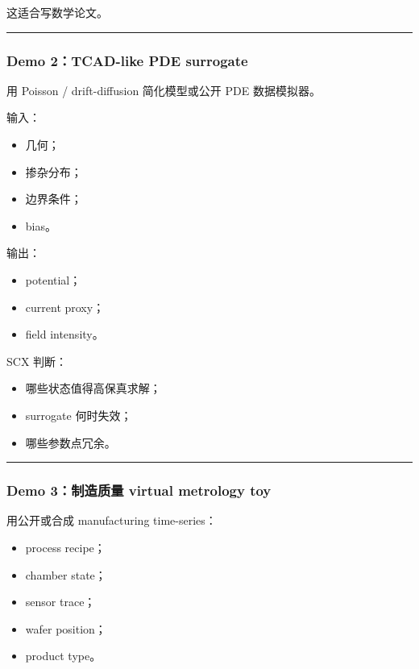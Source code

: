 \documentclass[
  12pt,
]{ctexart}
\providecommand{\tightlist}{%
  \setlength{\itemsep}{0pt}\setlength{\parskip}{0pt}}
\begin{document}
这适合写数学论文。

\begin{center}\rule{0.5\linewidth}{0.5pt}\end{center}

\subsubsection{Demo 2：TCAD-like PDE
surrogate}\label{demo-2tcad-like-pde-surrogate}

用 Poisson / drift-diffusion 简化模型或公开 PDE 数据模拟器。

输入：

\begin{itemize}
\tightlist
\item
  几何；
\item
  掺杂分布；
\item
  边界条件；
\item
  bias。
\end{itemize}

输出：

\begin{itemize}
\tightlist
\item
  potential；
\item
  current proxy；
\item
  field intensity。
\end{itemize}

SCX 判断：

\begin{itemize}
\tightlist
\item
  哪些状态值得高保真求解；
\item
  surrogate 何时失效；
\item
  哪些参数点冗余。
\end{itemize}

\begin{center}\rule{0.5\linewidth}{0.5pt}\end{center}

\subsubsection{Demo 3：制造质量 virtual metrology
toy}\label{demo-3ux5236ux9020ux8d28ux91cf-virtual-metrology-toy}

用公开或合成 manufacturing time-series：

\begin{itemize}
\tightlist
\item
  process recipe；
\item
  chamber state；
\item
  sensor trace；
\item
  wafer position；
\item
  product type。
\end{itemize}
\end{document}
